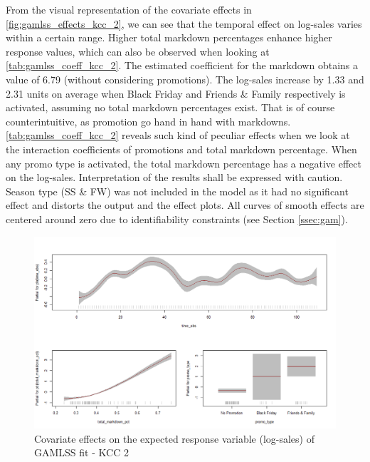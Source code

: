 From the visual representation of the covariate effects in \autoref{fig:gamlss_effects_kcc_2}, we can see that the temporal effect on log-sales varies within a certain range.
Higher total markdown percentages enhance higher response values, which can also be observed when looking at \autoref{tab:gamlss_coeff_kcc_2}. The estimated coefficient for the markdown obtains a value of 6.79 (without considering promotions). The log-sales increase by 1.33 and 2.31 units on average when Black Friday and Friends \& Family respectively is activated, assuming no total markdown percentages exist. That is of course counterintuitive, as promotion go hand in hand with markdowns. \autoref{tab:gamlss_coeff_kcc_2} reveals such kind of peculiar effects when we look at the interaction coefficients of promotions and total markdown percentage. When any promo type is activated, the total markdown percentage has a negative effect on the log-sales. Interpretation of the results shall be expressed with caution. Season type (SS \& FW) was not included in the model as it had no significant effect and distorts the output and the effect plots. All curves of smooth effects are centered around zero due to identifiability constraints (see Section \ref{ssec:gam}).
\\




\begin{figure}[H]
\centering
  \includegraphics[width=0.95\linewidth]{figures/gamlss_effects_kcc_2.png}
  \caption{Covariate effects on the expected response variable (log-sales) of GAMLSS fit - KCC 2}
  \label{fig:gamlss_effects_kcc_2}
\end{figure}





